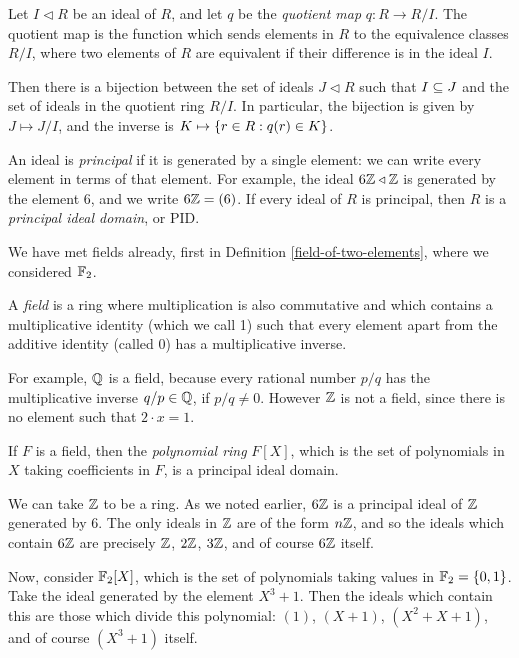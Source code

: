 \documentclass{article}
\begin{document}
\begin{theorem}
	\label{correspondence-theorem}
    Let $I \triangleleft R$ be an ideal of $R$, and let $q$ be the \textit{quotient map} $q : R \to R/I$. The quotient map is the function which sends elements in $R$ to the equivalence classes $R/I$, where two elements of $R$ are equivalent if their difference is in the ideal $I$.
    
    Then there is a bijection between the set of ideals $J \triangleleft R$ such that $I \subseteq J$ and the set of ideals in the quotient ring $R/I$. In particular, the bijection is given by $J \mapsto J/I$, and the inverse is $K \mapsto \left\lbrace r \in R : q(r) \in K \right\rbrace$.
\end{theorem}

\begin{definition}
	\label{principal-ideal-domain}
    An ideal is \textit{principal} if it is generated by a single element: we can write every element in terms of that element. For example, the ideal $6\mathbb{Z} \triangleleft \mathbb{Z}$ is generated by the element 6, and we write $6\mathbb{Z} = (6)$. If every ideal of $R$ is principal, then $R$ is a \textit{principal ideal domain}, or PID.
\end{definition}

We have met fields already, first in Definition \ref{field-of-two-elements}, where we considered $\mathbb{F}_2$.

\begin{definition}[Field]
    A \textit{field} is a ring where multiplication is also commutative and which contains a multiplicative identity (which we call 1) such that every element apart from the additive identity (called 0) has a multiplicative inverse.
    
    For example, $\mathbb{Q}$ is a field, because every rational number $p/q$ has the multiplicative inverse $q/p \in \mathbb{Q}$, if $p/q \neq 0$. However $\mathbb{Z}$ is not a field, since there is no element such that $2 \cdot x = 1$.
    
    If $F$ is a field, then the \textit{polynomial ring} $F[X]$, which is the set of polynomials in $X$ taking coefficients in $F$, is a principal ideal domain.
\end{definition}

\begin{example}
    We can take $\mathbb{Z}$ to be a ring. As we noted earlier, $6\mathbb{Z}$ is a principal ideal of $\mathbb{Z}$ generated by 6. The only ideals in $\mathbb{Z}$ are of the form $n\mathbb{Z}$, and so the ideals which contain $6\mathbb{Z}$ are precisely $\mathbb{Z}$, $2\mathbb{Z}$, $3\mathbb{Z}$, and of course $6\mathbb{Z}$ itself.
    
    Now, consider $\mathbb{F}_2[X]$, which is the set of polynomials taking values in $\mathbb{F}_2 = \left\lbrace 0, 1 \right\rbrace$. Take the ideal generated by the element $X^3 + 1$. Then the ideals which contain this are those which divide this polynomial: $(1)$, $(X+1)$, $(X^2 + X + 1)$, and of course $(X^3 + 1)$ itself.
\end{example}
\end{document}
